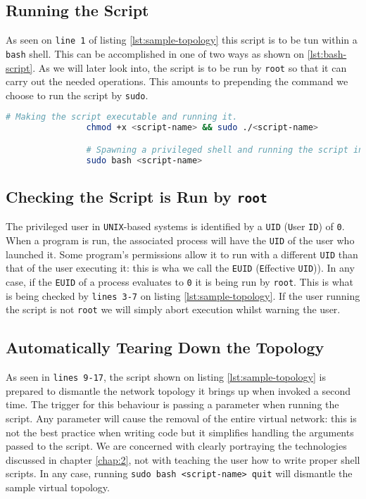         \subsection{Running the Script}
            As seen on \texttt{line 1} of listing \ref{lst:sample-topology} this script is to be tun within a \texttt{bash} shell. This can be accomplished in one of two ways as shown on \ref{lst:bash-script}. As we will later look into, the script is to be run by \texttt{root} so that it can carry out the needed operations. This amounts to prepending the command we choose to run the script by \texttt{sudo}.\\

            \begin{lstlisting}[language = bash, caption = Running a \texttt{bash} script., label = lst:bash-script]
                # Making the script executable and running it.
                chmod +x <script-name> && sudo ./<script-name>

                # Spawning a privileged shell and running the script in it.
                sudo bash <script-name>
            \end{lstlisting}

        \subsection{Checking the Script is Run by \texttt{root}}
            The privileged user in \texttt{UNIX}-based systems is identified by a \texttt{UID} (\texttt{U}ser \texttt{ID}) of \texttt{0}. When a program is run, the associated process will have the \texttt{UID} of the user who launched it. Some program's permissions allow it to run with a different \texttt{UID} than that of the user executing it: this is wha we call the \texttt{EUID} (\texttt{E}ffective \texttt{UID})). In any case, if the \texttt{EUID} of a process evaluates to \texttt{0} it is being run by \texttt{root}. This is what is being checked by \texttt{lines 3-7} on listing \ref{lst:sample-topology}. If the user running the script is not \texttt{root} we will simply abort execution whilst warning the user.\\

        \subsection{Automatically Tearing Down the Topology}
            As seen in \texttt{lines 9-17}, the script shown on listing \ref{lst:sample-topology} is prepared to dismantle the network topology it brings up when invoked a second time. The trigger for this behaviour is passing a parameter when running the script. Any parameter will cause the removal of the entire virtual network: this is not the best practice when writing code but it simplifies handling the arguments passed to the script. We are concerned with clearly portraying the technologies discussed in chapter \ref{chap:2}, not with teaching the user how to write proper shell scripts. In any case, running \texttt{sudo bash <script-name> quit} will dismantle the sample virtual topology.\\

